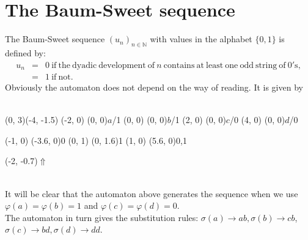 \documentclass{article}
\begin{document}
\section*{The Baum-Sweet sequence}
The Baum-Sweet sequence $(u_n)_{n \in \mathbb{N}}$ with values in the alphabet
$\{0, 1\}$ is defined by:\\
\vbox{\begin{eqnarray*}
u_n &=& 0 \mathrm{\ if\ the\ dyadic\ development\ of\ } n
          \mathrm{\ contains\ at\ least\ one\ odd\ string\ of\ 0's},\\
    &=& 1 \mathrm{\ if\ not.}
\end{eqnarray*}}
Obviously the automaton does not depend on the way of reading. It is given by\\
\\
\begin{graph}(0, 3)(-4, -1.5)
  (-2, 0) (0, 0){$a$/1}
  (0, 0)  (0, 0){$b$/1}
  (2, 0)  (0, 0){$c$/0}
  (4, 0)  (0, 0){$d$/0}

  (-1, 0) \freetext(-3.6, 0){0}
   
   
  (0, 1) \freetext(0, 1.6){1}
   
   
  (1, 0) \freetext(5.6, 0){0,1}

  \freetext(-2, -0.7){$\Uparrow$}
\end{graph}\\
It will be clear that the automaton above generates the sequence when we use
$\varphi(a) = \varphi(b) = 1$ and $\varphi(c) = \varphi(d) = 0$.\\
The automaton in turn gives the substitution rules:
$\sigma(a) \rightarrow ab, \sigma(b) \rightarrow cb$,
$\sigma(c) \rightarrow bd, \sigma(d) \rightarrow dd$.
\end{document}
